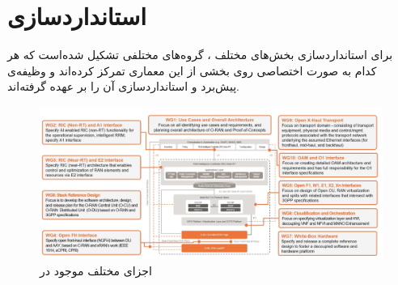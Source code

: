 \chapter{استانداردسازی}

برای استانداردسازی بخش‌های مختلف
،
گروه‌های مختلفی تشکیل شده‌است که هر کدام به صورت اختصاصی روی بخشی از این معماری تمرکز کرده‌اند و وظیفه‌ی پیش‌برد و استانداردسازی آن را بر عهده گرفته‌اند.

\begin{figure}[H]
	\includegraphics[width=0.85\columnwidth]{Picture/wg.png}
	\centering
	\caption{اجزای مختلف موجود در
		}
\end{figure}